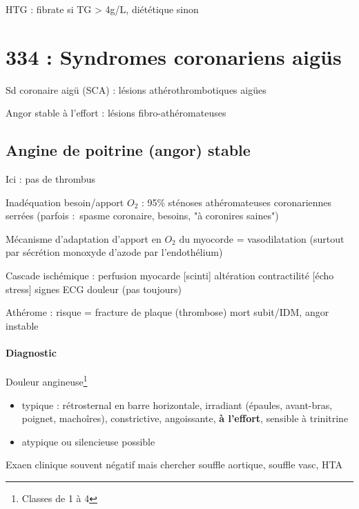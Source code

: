 HTG : fibrate si TG > 4g/L, diététique sinon



\section{334 : Syndromes coronariens aigüs}%
\label{sec:334_syndromes_coronariens_aigus}

Sd coronaire aigü (SCA) : lésions athérothrombotiques aigües

Angor stable à l'effort : lésions fibro-athéromateuses

\subsection{Angine de poitrine (angor) stable}
Ici : pas de thrombus

Inadéquation besoin/apport $O_2$ : 95\% sténoses athéromateuses coronariennes
serrées (parfois : spasme coronaire, \inc besoins, "à coronires saines")

Mécanisme d'adaptation d'apport en $O_2$ du myocorde = vasodilatation (surtout par
sécrétion monoxyde d'azode par l'endothélium)

Cascade ischémique : \dec perfusion myocarde [scinti] \thus altération
contractilité [écho stress] \thus signes ECG \thus douleur (pas toujours)

Athérome : risque = fracture de plaque \thus (thrombose) mort subit/IDM, angor
instable

\paragraph{Diagnostic}
Douleur angineuse\footnote{Classes de 1 à 4}
\begin{itemize}
  \item typique : rétrosternal en barre horizontale, irradiant (épaules,
    avant-bras, poignet, machoîres), constrictive, angoissante, \textbf{à
    l'effort}, sensible à trinitrine
  \item atypique ou silencieuse possible
\end{itemize}
Exaen clinique souvent négatif mais chercher souffle aortique, souffle vasc, HTA

